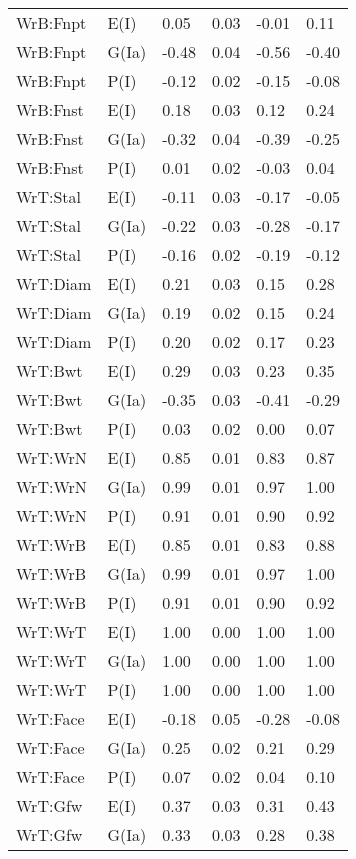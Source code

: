 \begin{center}
\begin{longtable}{|p{1.1in}|p{0.7in}|p{0.7in}|p{0.6in}|p{0.6in}|p{0.6in}|}
  WrB:Fnpt & E(I) & 0.05 & 0.03 & -0.01 & 0.11 \\ 
  WrB:Fnpt & G(Ia) & -0.48 & 0.04 & -0.56 & -0.40 \\ 
  WrB:Fnpt & P(I) & -0.12 & 0.02 & -0.15 & -0.08 \\ 
  WrB:Fnst & E(I) & 0.18 & 0.03 & 0.12 & 0.24 \\ 
  WrB:Fnst & G(Ia) & -0.32 & 0.04 & -0.39 & -0.25 \\ 
  WrB:Fnst & P(I) & 0.01 & 0.02 & -0.03 & 0.04 \\ 
  WrT:Stal & E(I) & -0.11 & 0.03 & -0.17 & -0.05 \\ 
  WrT:Stal & G(Ia) & -0.22 & 0.03 & -0.28 & -0.17 \\ 
  WrT:Stal & P(I) & -0.16 & 0.02 & -0.19 & -0.12 \\ 
  WrT:Diam & E(I) & 0.21 & 0.03 & 0.15 & 0.28 \\ 
  WrT:Diam & G(Ia) & 0.19 & 0.02 & 0.15 & 0.24 \\ 
  WrT:Diam & P(I) & 0.20 & 0.02 & 0.17 & 0.23 \\ 
  WrT:Bwt & E(I) & 0.29 & 0.03 & 0.23 & 0.35 \\ 
  WrT:Bwt & G(Ia) & -0.35 & 0.03 & -0.41 & -0.29 \\ 
  WrT:Bwt & P(I) & 0.03 & 0.02 & 0.00 & 0.07 \\ 
  WrT:WrN & E(I) & 0.85 & 0.01 & 0.83 & 0.87 \\ 
  WrT:WrN & G(Ia) & 0.99 & 0.01 & 0.97 & 1.00 \\ 
  WrT:WrN & P(I) & 0.91 & 0.01 & 0.90 & 0.92 \\ 
  WrT:WrB & E(I) & 0.85 & 0.01 & 0.83 & 0.88 \\ 
  WrT:WrB & G(Ia) & 0.99 & 0.01 & 0.97 & 1.00 \\ 
  WrT:WrB & P(I) & 0.91 & 0.01 & 0.90 & 0.92 \\ 
  WrT:WrT & E(I) & 1.00 & 0.00 & 1.00 & 1.00 \\ 
  WrT:WrT & G(Ia) & 1.00 & 0.00 & 1.00 & 1.00 \\ 
  WrT:WrT & P(I) & 1.00 & 0.00 & 1.00 & 1.00 \\ 
  WrT:Face & E(I) & -0.18 & 0.05 & -0.28 & -0.08 \\ 
  WrT:Face & G(Ia) & 0.25 & 0.02 & 0.21 & 0.29 \\ 
  WrT:Face & P(I) & 0.07 & 0.02 & 0.04 & 0.10 \\ 
  WrT:Gfw & E(I) & 0.37 & 0.03 & 0.31 & 0.43 \\ 
  WrT:Gfw & G(Ia) & 0.33 & 0.03 & 0.28 & 0.38 \\ 

\end{longtable}
\end{center}
